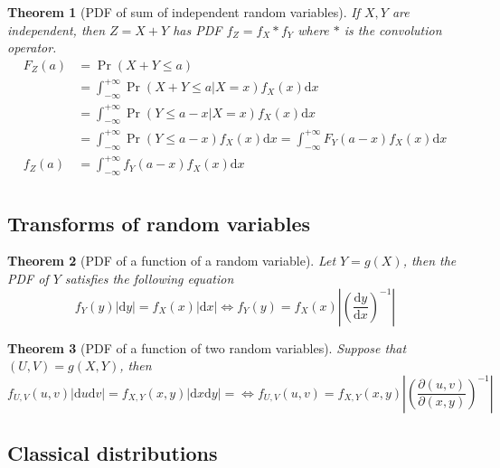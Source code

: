 \documentclass{article}
\newtheorem{theorem}{Theorem}[section]
\theoremstyle{definition}
\theoremstyle{remark}
\newcommand{\intoo}{\int_{-\infty}^{+\infty}}
\newcommand{\dx}{\mathrm{d}x}
\newcommand{\dy}{\mathrm{d}y}
\begin{document}
\begin{theorem}[PDF of sum of independent random variables]
	If \(X,Y\) are independent, then \(Z=X+Y\) has PDF \(f_Z = f_X \ast f_Y\) where \(\ast\) is the convolution operator.
	\begin{align*}
		F_Z(a) & = \Pr(X+Y\leq a)                         \\
		       & = \intoo \Pr(X+Y\leq a | X=x) f_X(x) \dx \\
		       & = \intoo \Pr(Y\leq a-x | X=x) f_X(x) \dx \\
		       & = \intoo \Pr(Y\leq a-x ) f_X(x) \dx
		= \intoo F_Y( a-x ) f_X(x) \dx                    \\
		f_Z(a) & = \intoo f_Y( a-x ) f_X(x) \dx           \\
	\end{align*}
\end{theorem}


\subsection{Transforms of random variables}

\begin{theorem}[PDF of a function of a random variable]
	Let \(Y=g(X)\), then the PDF of \(Y\) satisfies the following equation
	\[
		f_Y(y) |\dy| = f_X(x) |\dx|
		\iff
		f_Y(y) = f_X(x) \left\vert{\left( \frac{\dy}{\dx} \right)}^{-1}\right\vert
	\]
\end{theorem}
\begin{theorem}[PDF of a function of two random variables]
	Suppose that \( (U,V) = g(X,Y) \), then
	\[
		f_{U,V}(u,v) |\mathrm{d}u\mathrm{d}v| = f_{X,Y}(x,y) |\mathrm{d}x\mathrm{d}y| =
		\iff
		f_{U,V}(u,v) = f_{X,Y}(x,y)
		\left\vert{\left( \frac{\partial(u,v)}{\partial(x,y)} \right)}^{-1}\right\vert
	\]
\end{theorem}

\subsection{Classical distributions}
\end{document}
